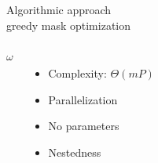 \begin{frame}{Algorithmic approach\\[-3mm] {\normalsize greedy mask optimization \parencite{gozcu2018learning}} }
\begin{columns}[T]
\begin{algorithm}[H]
\begin{algorithmic}[1]
 \EndWhile
  $\omega$
\end{algorithmic}
\end{algorithm}
\vspace{1cm}
\begin{itemize}
\item Complexity: $\Theta(mP)$ 
\item Parallelization
\item No parameters
\item  Nestedness
\end{itemize}
\end{columns}	

\end{frame}


